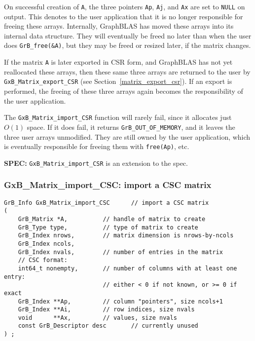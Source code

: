 \documentclass[12pt]{article}
\begin{document}
On successful creation of \verb'A', the three pointers \verb'Ap', \verb'Aj',
and \verb'Ax' are set to \verb'NULL' on output.  This denotes to the user
application that it is no longer responsible for freeing these arrays.
Internally, GraphBLAS has moved these arrays into its internal data structure.
They will eventually be freed no later than when the user does
\verb'GrB_free(&A)', but they may be freed or resized later, if the matrix
changes.

If the matrix \verb'A' is later exported in CSR form, and GraphBLAS has not yet
reallocated these arrays, then these same three arrays are returned to the user
by \verb'GxB_Matrix_export_CSR' (see Section~\ref{matrix_export_csr}).  If an
export is performed, the freeing of these three arrays again becomes the
responsibility of the user application.

The \verb'GxB_Matrix_import_CSR' function will rarely fail, since it allocates
just $O(1)$ space.  If it does fail, it returns \verb'GrB_OUT_OF_MEMORY',
and it leaves the three user arrays unmodified.  They are still owned by
the user application, which is eventually responsible for freeing them with
\verb'free(Ap)', etc.

\begin{spec}
{\bf SPEC:} \verb'GxB_Matrix_import_CSR' is an extension to the spec.
\end{spec}

\newpage
\subsubsection{{\sf GxB\_Matrix\_import\_CSC:} import a CSC matrix}
\label{matrix_import_csc}

\begin{mdframed}[userdefinedwidth=6in]
{\footnotesize
\begin{verbatim}
GrB_Info GxB_Matrix_import_CSC      // import a CSC matrix
(
    GrB_Matrix *A,          // handle of matrix to create
    GrB_Type type,          // type of matrix to create
    GrB_Index nrows,        // matrix dimension is nrows-by-ncols
    GrB_Index ncols,
    GrB_Index nvals,        // number of entries in the matrix
    // CSC format:
    int64_t nonempty,       // number of columns with at least one entry:
                            // either < 0 if not known, or >= 0 if exact
    GrB_Index **Ap,         // column "pointers", size ncols+1
    GrB_Index **Ai,         // row indices, size nvals
    void      **Ax,         // values, size nvals
    const GrB_Descriptor desc       // currently unused
) ;
\end{verbatim}
} \end{mdframed}
\end{document}
